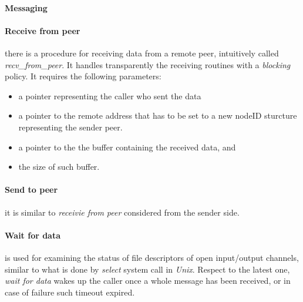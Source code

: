 \paragraph{Messaging} 
\paragraph{Receive from peer} there is a procedure for receiving data from a remote peer, intuitively called
\textit{recv\_from\_peer}. It handles transparently the receiving routines with a \textit{blocking} policy.
It requires the following parameters:
\begin{itemize}
\item a pointer representing the caller who sent the data
\item a pointer to the remote address that has to be set to a new nodeID sturcture representing the sender peer.
\item a pointer to the the buffer containing the received data, and
\item the size of such buffer.
\end{itemize}

\paragraph{Send to peer}
it is similar to \textit{receivie from peer} considered from the sender side.

\paragraph{Wait for data} is used for examining the status of file descriptors of open input/output channels,
similar to what is done by \textit{select} system call in \textit{Unix}. Respect to the latest one,
\textit{wait for data} wakes up the caller once a whole message has been received, or in case of failure such
timeout expired.

